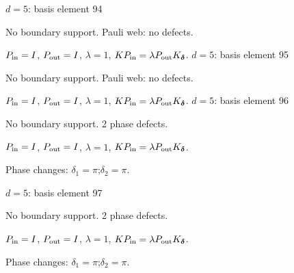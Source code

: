 \vfill
{\footnotesize\texttt{}}
\newpage
{}
{\Large $d=5$: basis element 94}\par
No boundary support. Pauli web: no defects.
\begin{center}
\end{center}
\vspace{-1mm}
$P_{\rm in}=I$, \quad $P_{\rm out}=I$, \quad $\lambda=1$, \qquad $K P_{\rm in}=\lambda P_{\rm out}K_{\boldsymbol\delta}$.
\vfill
{\footnotesize\texttt{}}
\newpage
{}
{\Large $d=5$: basis element 95}\par
No boundary support. Pauli web: no defects.
\begin{center}
\end{center}
\vspace{-1mm}
$P_{\rm in}=I$, \quad $P_{\rm out}=I$, \quad $\lambda=1$, \qquad $K P_{\rm in}=\lambda P_{\rm out}K_{\boldsymbol\delta}$.
\vfill
{\footnotesize\texttt{}}
\newpage
{}
{\Large $d=5$: basis element 96}\par
No boundary support. 2 phase defects.
\begin{center}
\end{center}
\vspace{-1mm}
$P_{\rm in}=I$, \quad $P_{\rm out}=I$, \quad $\lambda=1$, \qquad $K P_{\rm in}=\lambda P_{\rm out}K_{\boldsymbol\delta}$.
\par\smallskip\begin{minipage}{.98\linewidth}\small Phase changes: $\delta_{1}=\pi$;\quad $\delta_{2}=\pi$.\end{minipage}
\vfill
{\footnotesize\texttt{}}
\newpage
{}
{\Large $d=5$: basis element 97}\par
No boundary support. 2 phase defects.
\begin{center}
\end{center}
\vspace{-1mm}
$P_{\rm in}=I$, \quad $P_{\rm out}=I$, \quad $\lambda=1$, \qquad $K P_{\rm in}=\lambda P_{\rm out}K_{\boldsymbol\delta}$.
\par\smallskip\begin{minipage}{.98\linewidth}\small Phase changes: $\delta_{1}=\pi$;\quad $\delta_{2}=\pi$.\end{minipage}
